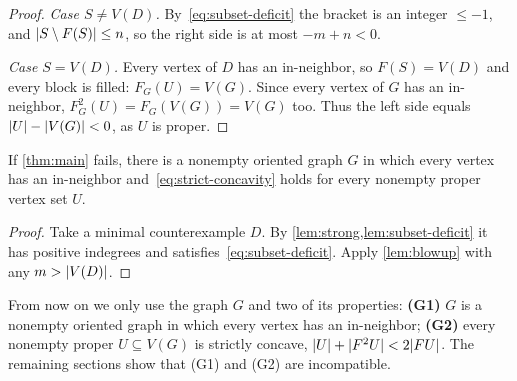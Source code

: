 \begin{proof}
\emph{Case $S\ne V(D)$.} By~\eqref{eq:subset-deficit} the bracket is an integer
$\le-1$, and $\lvert S\setminus F(S)\rvert\le n$, so the right side is at most
$-m+n<0$.

\emph{Case $S=V(D)$.} Every vertex of $D$ has an in-neighbor, so
$F(S)=V(D)$ and every block is filled: $F_G(U)=V(G)$. Since every vertex of
$G$ has an in-neighbor, $F_G^2(U)=F_G(V(G))=V(G)$ too. Thus the left side
equals $\lvert U\rvert-\lvert V(G)\rvert<0$, as $U$ is proper.
\end{proof}

\begin{proposition}\label{prop:reduction}
If \cref{thm:main} fails, there is a nonempty oriented graph $G$ in which
every vertex has an in-neighbor and~\eqref{eq:strict-concavity} holds for
every nonempty proper vertex set $U$.
\end{proposition}

\begin{proof}
Take a minimal counterexample $D$. By \cref{lem:strong,lem:subset-deficit}
it has positive indegrees and satisfies~\eqref{eq:subset-deficit}. Apply
\cref{lem:blowup} with any $m>\lvert V(D)\rvert$.
\end{proof}

\begin{idea}
From now on we only use the graph $G$ and two of its properties:
\textbf{(G1)} $G$ is a nonempty oriented graph in which every vertex has an
in-neighbor; \textbf{(G2)} every nonempty proper $U\subseteq V(G)$ is
strictly concave, $\lvert U\rvert+\lvert F^2U\rvert<2\lvert FU\rvert$. The remaining sections show
that (G1) and (G2) are incompatible.
\end{idea}
